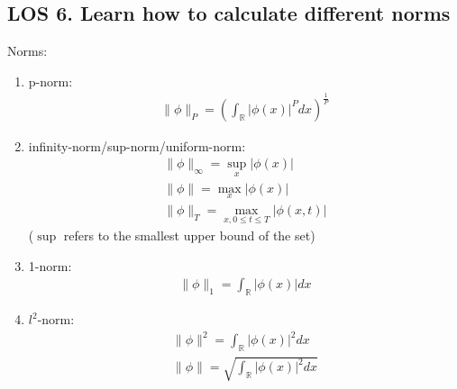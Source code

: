 \documentclass[12pt, a4paper]{article}
\begin{document}
\subsection*{LOS 6. Learn how to calculate different norms}
Norms:
\begin{enumerate}
    \item p-norm:
    \begin{gather*}
        \|\phi\|_P = \left(\int_{\mathbb{R}}|\phi(x)|^Pdx\right)^{\frac{1}{P}}
    \end{gather*}
    \item infinity-norm/sup-norm/uniform-norm:
    \begin{gather*}
        \|\phi\|_{\infty}  = \sup_x|\phi(x)|\\
        \|\phi\| = \max_{x}|\phi(x)|\\
        \|\phi\|_T = \max_{x, 0\leq t\leq T}|\phi(x, t)|
    \end{gather*}
    {\tiny*($\sup$ refers to the smallest upper bound of the set)}
    \item 1-norm:
    \begin{gather*}
        \|\phi\|_1 = \int_{\mathbb{R}}|\phi(x)|dx
    \end{gather*}
    \item $l^2$-norm:
    \begin{gather*}
        \|\phi\|^2 = \int_{\mathbb{R}}|\phi(x)|^2dx\\
        \|\phi\| = \sqrt{\int_{\mathbb{R}}|\phi(x)|^2dx}
    \end{gather*}
\end{enumerate}
\vspace{0.3em}
\end{document}
